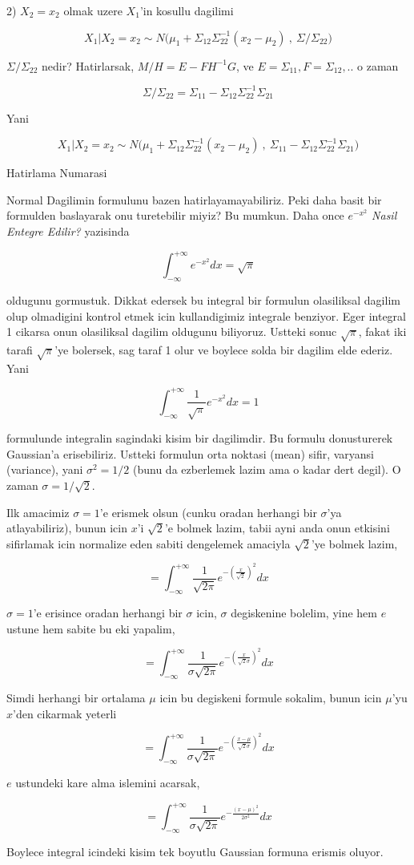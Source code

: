 \documentclass[12pt,fleqn]{article}\usepackage{../common}
\begin{document}
2) $X_2 = x_2$ olmak uzere $X_1$'in kosullu dagilimi 

\[ X_1 | X_2 = x_2 \sim 
N\bigg(\mu_1 + \Sigma_{12}\Sigma_{22}^{-1} (x_2 -\mu_2) \ , \
\Sigma/\Sigma_{22} \bigg)
 \]

$\Sigma/\Sigma_{22}$ nedir? Hatirlarsak, $M/H = E-FH^{-1}G$, ve 
$E = \Sigma_{11},F=\Sigma_{12},..$ o zaman 

\[ \Sigma/\Sigma_{22} = \Sigma_{11}-\Sigma_{12} \Sigma_{22}^{-1} \Sigma_{21} \]

Yani

\[ X_1 | X_2 = x_2 \sim 
N\bigg(\mu_1 + \Sigma_{12}\Sigma_{22}^{-1} (x_2 -\mu_2) \ , \
\Sigma_{11}-\Sigma_{12} \Sigma_{22}^{-1} \Sigma_{21}
\bigg)
 \]

Hatirlama Numarasi

Normal Dagilimin formulunu bazen hatirlayamayabiliriz. Peki daha basit bir
formulden baslayarak onu turetebilir miyiz? Bu mumkun. Daha once {\em
  $e^{-x^2}$ Nasil Entegre Edilir?} yazisinda

$$ \int _{-\infty}^{+\infty} e^{-x^2} dx= \sqrt{\pi} $$

oldugunu gormustuk. Dikkat edersek bu integral bir formulun olasiliksal
dagilim olup olmadigini kontrol etmek icin kullandigimiz integrale
benziyor. Eger integral 1 cikarsa onun olasiliksal dagilim oldugunu
biliyoruz. Ustteki sonuc $\sqrt{\pi}$, fakat iki tarafi $\sqrt{\pi}$'ye
bolersek, sag taraf 1 olur ve boylece solda bir dagilim elde ederiz. Yani

$$ \int _{-\infty}^{+\infty} \frac{1}{\sqrt{\pi}} e^{-x^2} dx = 1$$

formulunde integralin sagindaki kisim bir dagilimdir. Bu formulu
donusturerek Gaussian'a erisebiliriz. Ustteki formulun orta noktasi (mean)
sifir, varyansi (variance), yani $\sigma^2 = 1/2$ (bunu da ezberlemek lazim
ama o kadar dert degil). O zaman $\sigma = 1 / \sqrt{2}$.

Ilk amacimiz $\sigma = 1$'e erismek olsun (cunku oradan herhangi bir
$\sigma$'ya atlayabiliriz), bunun icin $x$'i $\sqrt{2}$'e bolmek lazim,
tabii ayni anda onun etkisini sifirlamak icin normalize eden sabiti
dengelemek amaciyla $\sqrt{2}$'ye bolmek lazim,

$$ = \int _{-\infty}^{+\infty} \frac{1}{\sqrt{2\pi}} e^{-(\frac{x}{\sqrt{2}})^2} dx$$

$\sigma = 1$'e erisince oradan herhangi bir $\sigma$ icin, $\sigma$
degiskenine bolelim, yine hem $e$ ustune hem sabite bu eki yapalim,

$$ = \int _{-\infty}^{+\infty} 
\frac{1}{\sigma \sqrt{2\pi}} 
e^{-(\frac{x}{\sqrt{2} \sigma })^2} dx
$$

Simdi herhangi bir ortalama $\mu$ icin bu degiskeni formule sokalim, bunun
icin $\mu$'yu $x$'den cikarmak yeterli

$$ = \int _{-\infty}^{+\infty} 
\frac{1}{\sigma \sqrt{2\pi}} 
e^{-(\frac{x-\mu}{\sqrt{2} \sigma })^2} dx
$$

$e$ ustundeki kare alma islemini acarsak,

$$ = \int _{-\infty}^{+\infty} 
\frac{1}{\sigma \sqrt{2\pi}} 
e^{-  \frac{(x-\mu)^2}{2 \sigma^2 }} dx
$$


Boylece integral icindeki kisim tek boyutlu Gaussian formuna erismis
oluyor. 
\end{document}
